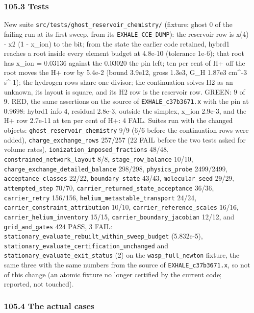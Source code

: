 \documentclass[english,a4paper]{my_memo}
\begin{document}
\subsubsection{105.3 Tests}\label{1053-tests}

New suite \texttt{src/tests/ghost\_reservoir\_chemistry/} (fixture: ghost 0 of the
failing run at its first sweep, from its \texttt{EXHALE\_CCE\_DUMP}): the reservoir
row is x(4) - x2 (1 - x\_ion) to the bit; from the state the earlier code
retained, hybrd1 reaches a root inside every element budget at 4.8e-10
(tolerance 1e-6); that root has x\_ion = 0.03136 against the 0.03020 the pin
left; ten per cent of H+ off the root moves the H+ row by 5.4e-2 (bound
3.9e12, gross 1.3e3, G\_H 1.87e3 cm\^{}-3 s\^{}-1); the hydrogen rows share one
divisor; the continuation solves H2 as an unknown, its layout is square, and
its H2 row is the reservoir row. GREEN: 9 of 9. RED, the same assertions on
the source of \texttt{EXHALE\_c37b3671.x} with the pin at 0.9698: hybrd1 info 4,
residual 2.8e-3, outside the simplex, x\_ion 2.9e-3, and the H+ row 2.7e-11
at ten per cent of H+: 4 FAIL. Suites run with the changed objects:
\texttt{ghost\_reservoir\_chemistry} 9/9 (6/6 before the continuation rows were
added), \texttt{charge\_exchange\_rows} 257/257 (22 FAIL before the two tests asked
for volume rates), \texttt{ionization\_imposed\_fractions} 48/48,
\texttt{constrained\_network\_layout} 8/8, \texttt{stage\_row\_balance} 10/10,
\texttt{charge\_exchange\_detailed\_balance} 298/298, \texttt{physics\_probe} 2499/2499,
\texttt{acceptance\_classes} 22/22, \texttt{boundary\_state} 43/43, \texttt{molecular\_seed} 29/29,
\texttt{attempted\_step} 70/70, \texttt{carrier\_returned\_state\_acceptance} 36/36,
\texttt{carrier\_retry} 156/156, \texttt{helium\_metastable\_transport} 24/24,
\texttt{carrier\_constraint\_attribution} 10/10, \texttt{carrier\_reference\_scales} 16/16,
\texttt{carrier\_helium\_inventory} 15/15, \texttt{carrier\_boundary\_jacobian} 12/12, and
\texttt{grid\_and\_gates} 424 PASS, 3 FAIL: \texttt{stationary\_evaluate\_rebuilt\_within\_sweep\_budget}
(5.832e-5), \texttt{stationary\_evaluate\_certification\_unchanged} and
\texttt{stationary\_evaluate\_exit\_status} (2) on the \texttt{wasp\_full\_newton} fixture, the
same three with the same numbers from the source of \texttt{EXHALE\_c37b3671.x}, so
not of this change (an atomic fixture no longer certified by the current
code; reported, not touched).

\subsubsection{105.4 The actual cases}\label{1054-the-actual-cases}
\end{document}
